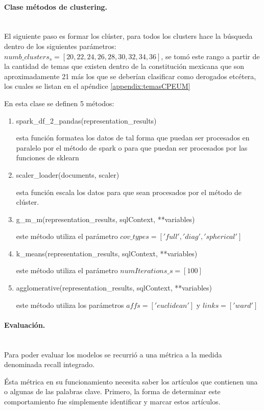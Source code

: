 \documentclass[12pt]{article}
\newcommand{\subsubsubsection}[1]{\paragraph{#1}\mbox{}\\}
\begin{document}
				\subsubsubsection{Clase métodos de clustering.}
				El siguiente paso es formar los clúster, para todos los clusters hace la búsqueda dentro de los siguientes parámetros: $numb\_clusters_s = [20,22,24,26,28,30,32,34,36]$, se tomó este rango a partir de la cantidad de temas que existen dentro de la constitución mexicana que son aproximadamente 21 más los que se deberían clasificar como derogados etcétera, los cuales se listan en el apéndice \ref{appendix:temasCPEUM}
				
				En esta clase se definen 5 métodos:
			
				\begin{enumerate}
					\item spark\_df\_2\_pandas(representation\_results)
					
					esta función formatea los datos de tal forma que puedan ser procesados en paralelo por el método de spark o para que puedan ser procesados por las funciones de sklearn
					
					\item scaler\_loader(documents, scaler)
					
					esta función escala los datos para que sean procesados por el método de clúster.
					
					\item g\_m\_m(representation\_results, sqlContext, **variables)
					
					este método utiliza el parámetro $cov\_types = ['full', 'diag', 'spherical']$
					
					\item k\_means(representation\_results, sqlContext, **variables)
				
					este método utiliza el parámetro $numIterations\_s = [100]$
					
					\item agglomerative(representation\_results, sqlContext, **variables)
								
					este método utiliza los parámetros $affs = ['euclidean']$ y $links = ['ward']$
					
				\end{enumerate}
							
				\subsubsubsection{Evaluación.}
				Para poder evaluar los modelos se recurrió a una métrica a la medida denominada recall integrado.
				
				Ésta métrica en su funcionamiento necesita saber los artículos que contienen una o algunas de las palabras clave. Primero, la forma de determinar este comportamiento fue simplemente identificar y marcar estos artículos. 
				
\end{document}
